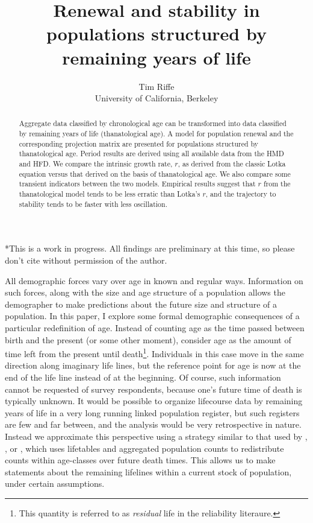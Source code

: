\documentclass{article}
\begin{document}
\title{Renewal and stability in populations structured by remaining
years of life}
\author{Tim Riffe \\ University of California, Berkeley}
\maketitle

\begin{abstract}
Aggregate data classified by chronological age can be transformed into data
classified by remaining years of life (thanatological age). A model for population renewal and
the corresponding projection matrix are presented for populations structured by
thanatological age. Period results are derived using all available data from the
HMD and HFD. We compare the intrinsic growth rate, $r$, as derived from the
classic Lotka equation versus that derived on the basis of thanatological age.
We also compare some transient indicators between the two
models. Empirical results suggest that $r$ from the thanatological model tends to be less erratic than
Lotka's $r$, and the trajectory to stability tends to be faster with less
oscillation.
\end{abstract}

*This is a work in progress. All findings are preliminary at this time, so
please don't cite without permission of the author.
\vspace{2em}

All demographic forces vary over age in known and regular ways. Information on
such forces, along with the size and age structure of a population allows the
demographer to make predictions about the future size and structure of a population. In this
paper, I explore some formal demographic consequences of a particular
redefinition of age. Instead of counting age as the time passed between birth and the present (or
some other moment), consider age as the amount of time left from the present
until death\footnote{This quantity is referred to as \textit{residual} life in
the reliability literaure.}.
Individuals in this case move in the same direction along imaginary life lines, but the reference point for age is now at the end of the
life line instead of at the beginning. Of course, such information cannot be
requested of survey respondents,
because one's future time of death is typically unknown. It would be
possible to organize lifecourse data by remaining years of life in a
very long running linked population register, but such registers are few and far
between, and the analysis would be very retrospective in nature.
Instead we approximate this perspective using a strategy similar to that used by
\citet{brouard1986structure}, \citet{miller2001increasing}, or
\citet{lee2002approach}, which uses lifetables and aggregated population counts to redistribute counts within age-classes over
future death times. This allows us to make statements about the remaining
lifelines within a current stock of population, under certain assumptions.
\end{document}
